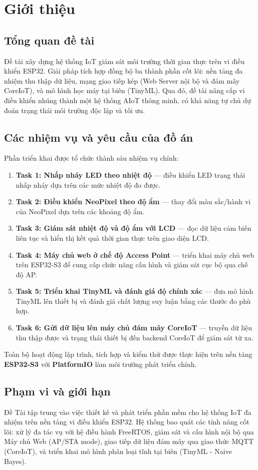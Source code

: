\newpage
\section{Giới thiệu}
\subsection{Tổng quan đề tài}
Đề tài xây dựng hệ thống IoT giám sát môi trường thời gian thực trên vi điều khiển ESP32. Giải pháp tích hợp đồng bộ ba thành phần cốt lõi: nền tảng đa nhiệm thu thập dữ liệu, mạng giao tiếp kép (Web Server nội bộ và đám mây CoreIoT), và mô hình học máy tại biên (TinyML). Qua đó, đề tài nâng cấp vi điều khiển nhúng thành một hệ thống AIoT thông minh, có khả năng tự chủ dự đoán trạng thái môi trường độc lập và tối ưu.
\subsection{Các nhiệm vụ và yêu cầu của đồ án}
Phần triển khai được tổ chức thành sáu nhiệm vụ chính:
\begin{enumerate}
	\item \textbf{Task 1: Nhấp nháy LED theo nhiệt độ} --- điều khiển LED trạng thái nhấp nháy dựa trên các mức nhiệt độ đo được.
	\item \textbf{Task 2: Điều khiển NeoPixel theo độ ẩm} --- thay đổi màu sắc/hành vi của NeoPixel dựa trên các khoảng độ ẩm.
	\item \textbf{Task 3: Giám sát nhiệt độ và độ ẩm với LCD} --- đọc dữ liệu cảm biến liên tục và hiển thị kết quả thời gian thực trên giao diện LCD.
	\item \textbf{Task 4: Máy chủ web ở chế độ Access Point} --- triển khai máy chủ web trên ESP32-S3 để cung cấp chức năng cấu hình và giám sát cục bộ qua chế độ AP.
	\item \textbf{Task 5: Triển khai TinyML và đánh giá độ chính xác} --- đưa mô hình TinyML lên thiết bị và đánh giá chất lượng suy luận bằng các thước đo phù hợp.
	\item \textbf{Task 6: Gửi dữ liệu lên máy chủ đám mây CoreIoT} --- truyền dữ liệu thu thập được và trạng thái thiết bị đến backend CoreIoT để giám sát từ xa.
\end{enumerate}

Toàn bộ hoạt động lập trình, tích hợp và kiểm thử được thực hiện trên nền tảng \textbf{ESP32-S3} với \textbf{PlatformIO} làm môi trường phát triển chính.

\subsection{Phạm vi và giới hạn}
 Đề Tài tập trung vào việc thiết kế và phát triển phần mềm cho hệ thống IoT đa nhiệm trên nền tảng vi điều khiển ESP32. Hệ thống bao quát các tính năng cốt lõi: xử lý đa tác vụ với hệ điều hành FreeRTOS, giám sát và cấu hình nội bộ qua Máy chủ Web (AP/STA mode), giao tiếp dữ liệu đám mây qua giao thức MQTT (CoreIoT), và triển khai mô hình phân loại tĩnh tại biên (TinyML - Naive Bayes).

